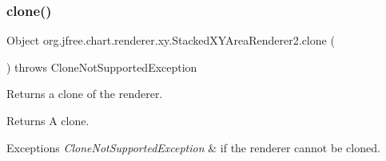 \subsubsection{\texorpdfstring{clone()}{clone()}}
{\footnotesize\ttfamily Object org.\+jfree.\+chart.\+renderer.\+xy.\+Stacked\+X\+Y\+Area\+Renderer2.\+clone (\begin{DoxyParamCaption}{ }\end{DoxyParamCaption}) throws Clone\+Not\+Supported\+Exception}

Returns a clone of the renderer.

\begin{DoxyReturn}{Returns}
A clone.
\end{DoxyReturn}

\begin{DoxyExceptions}{Exceptions}
{\em Clone\+Not\+Supported\+Exception} & if the renderer cannot be cloned. \\
\hline
\end{DoxyExceptions}
\mbox{\label{classorg_1_1jfree_1_1chart_1_1renderer_1_1xy_1_1_stacked_x_y_area_renderer2_af0feef5e61eac8d17f50d5ba1e4b9c89}} 
